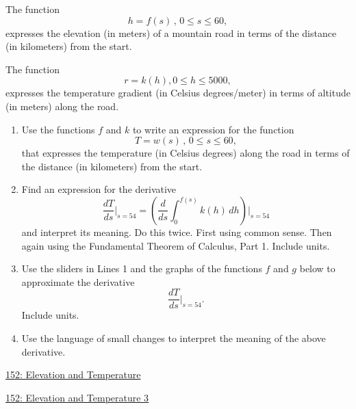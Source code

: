 \documentclass{ximera}
\begin{document}
\begin{question}  \label{Q9erKKe33399}
The function
\[
   h = f(s) \, , \, 0\leq s \leq 60 ,
\]
expresses the elevation (in meters) of a mountain road in terms of the distance (in kilometers) from the start.

The function 
\[
    r = k(h) , 0\leq h \leq 5000 ,
\] 
expresses the temperature gradient (in Celsius degrees/meter) in terms of altitude (in meters) along the road.

\begin{enumerate}
\item Use the functions $f$ and $k$ to write an expression for the function
\[
 T = w(s) \, , \, 0\leq s \leq 60 ,
\]
that expresses the temperature (in Celsius degrees) along the road in terms of the distance (in kilometers) from the start.

\item Find an expression for the derivative
\[
   \frac{dT}{ds}\Big|_{s=54} =  \left(  \frac{d}{ds} \int_0^{f(s)} k(h)\, dh       \right)\Big| _{s=54}
\]
and interpret its meaning. Do this twice. First using common sense. Then again using the Fundamental Theorem of Calculus, Part 1. Include units.


\item Use the sliders in Lines 1 and the graphs of the functions $f$ and $g$ below to approximate the derivative
\[
   \frac{dT}{ds}\Big|_{s=54} .
\]
Include units.

\item Use the language of small changes to interpret the meaning of the above derivative.
\end{enumerate}

\begin{onlineOnly}
    \begin{center}
\end{center}
\end{onlineOnly}

\href{https://www.desmos.com/calculator/gcmfa2a6jz}{152: Elevation and Temperature}

\begin{onlineOnly}
    \begin{center}
\end{center}
\end{onlineOnly}

\href{https://www.desmos.com/calculator/vvr0qrgoh1}{152: Elevation and Temperature 3}
\end{question}
\end{document}
